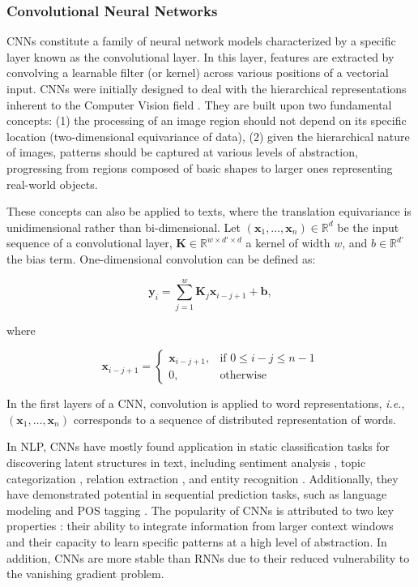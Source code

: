 \subsubsection{Convolutional Neural Networks}

\acp{CNN} constitute a family of neural network models characterized by a specific layer known as the convolutional layer. In this layer, features are extracted by convolving a learnable filter (or kernel) across various positions of a vectorial input.
\acp{CNN} were initially designed to deal with the hierarchical representations inherent to the Computer Vision field \citep{lecun1989backpropagation}. They are built upon two fundamental concepts: (1) the processing of an image region should not depend on its specific location (two-dimensional equivariance of data), (2) given the hierarchical nature of images, patterns should be captured at various levels of abstraction, progressing from regions composed of basic shapes to larger ones representing real-world objects. 

These concepts can also be applied to texts, where the translation equivariance is unidimensional rather than bi-dimensional. Let $(\bm{x}_1, \ldots, \bm{x}_n) \in \mathbb{R}^d$ be the input sequence of a convolutional layer, $\bm{K} \in \mathbb{R}^{w \times d' \times d}$ a kernel of width $w$, and $b \in \mathbb{R}^{d'}$ the bias term. One-dimensional convolution can be defined as:

\begin{equation}
    \bm{y}_i = \sum_{j=1}^w \bm{K}_j \bm{x}_{i-j+1} + \bm{b},
\end{equation}

\noindent where

\[
    \bm{x}_{i-j+1} = 
        \begin{cases}
            \bm{x}_{i-j+1}, & \text{if } 0 \leq i-j \leq n-1 \\
            0,              & \text{otherwise}
        \end{cases}
\]

In the first layers of a \ac{CNN}, convolution is applied to word representations, \textit{i.e.}, $(\bm{x}_1, \ldots, \bm{x}_n)$ corresponds to a sequence of distributed representation of words. 

In \ac{NLP}, \acp{CNN} have mostly found application in static classification tasks for discovering latent structures in text, including sentiment analysis \citep{kalchbrenner2014convolutional}, topic categorization \citep{kim2014convolutional}, relation extraction \citep{nguyen2015relation}, and entity recognition \citep{adel2016comparing}. Additionally, they have demonstrated potential in sequential prediction tasks, such as language modeling \citep{pham2016convolutional} and \ac{POS} tagging \citep{collobert2011natural}. The popularity of \acp{CNN} is attributed to two key properties \citep{pham2016convolutional}: their ability to integrate information from larger context windows and their capacity to learn specific patterns at a high level of abstraction. In addition, \acp{CNN} are more stable than \acp{RNN} due to their reduced vulnerability to the vanishing gradient problem.

